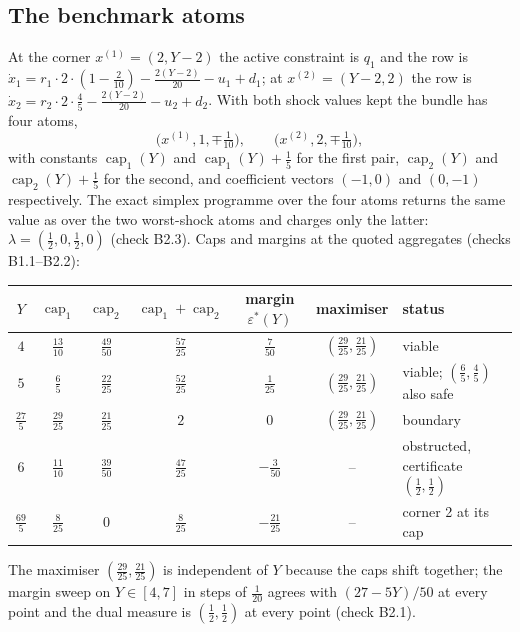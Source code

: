 \documentclass[11pt,a4paper]{article}
\theoremstyle{plain}
\theoremstyle{definition}
\theoremstyle{remark}
\newcommand{\capi}[1]{\operatorname{cap}_{#1}}
\newcommand{\tfr}[2]{\tfrac{#1}{#2}}
\begin{document}
\subsection{The benchmark atoms}
At the corner $x^{(1)}=(2,Y-2)$ the active constraint is $q_1$ and the row is $\dot x_1=r_1\cdot2\cdot(1-\tfr2{10})-\tfr{2(Y-2)}{20}-u_1+d_1$; at $x^{(2)}=(Y-2,2)$ the row is $\dot x_2=r_2\cdot2\cdot\tfr45-\tfr{2(Y-2)}{20}-u_2+d_2$. With both shock values kept the bundle has four atoms,
\[
\bigl(x^{(1)},1,\mp\tfr1{10}\bigr),\qquad \bigl(x^{(2)},2,\mp\tfr1{10}\bigr),
\]
with constants $\capi1(Y)$ and $\capi1(Y)+\tfr15$ for the first pair, $\capi2(Y)$ and $\capi2(Y)+\tfr15$ for the second, and coefficient vectors $(-1,0)$ and $(0,-1)$ respectively. The exact simplex programme over the four atoms returns the same value as over the two worst-shock atoms and charges only the latter: $\lambda=(\tfr12,0,\tfr12,0)$ (check B2.3). Caps and margins at the quoted aggregates (checks B1.1--B2.2):
\begin{center}\footnotesize
\begin{tabularx}{\textwidth}{cccccc>{\raggedright\arraybackslash}X}
\toprule
$Y$ & $\capi1$ & $\capi2$ & $\capi1+\capi2$ & margin $\varepsilon^\ast(Y)$ & maximiser & status\\
\midrule
$4$ & $\tfrac{13}{10}$ & $\tfrac{49}{50}$ & $\tfrac{57}{25}$ & $\tfrac{7}{50}$ & $(\tfrac{29}{25},\tfrac{21}{25})$ & viable\\
$5$ & $\tfrac{6}{5}$ & $\tfrac{22}{25}$ & $\tfrac{52}{25}$ & $\tfrac{1}{25}$ & $(\tfrac{29}{25},\tfrac{21}{25})$ & viable; $(\tfrac65,\tfrac45)$ also safe\\
$\tfrac{27}{5}$ & $\tfrac{29}{25}$ & $\tfrac{21}{25}$ & $2$ & $0$ & $(\tfrac{29}{25},\tfrac{21}{25})$ & boundary\\
$6$ & $\tfrac{11}{10}$ & $\tfrac{39}{50}$ & $\tfrac{47}{25}$ & $-\tfrac{3}{50}$ & -- & obstructed, certificate $(\tfrac12,\tfrac12)$\\
$\tfrac{69}{5}$ & $\tfrac{8}{25}$ & $0$ & $\tfrac{8}{25}$ & $-\tfrac{21}{25}$ & -- & corner 2 at its cap\\
\bottomrule
\end{tabularx}
\end{center}
The maximiser $(\tfr{29}{25},\tfr{21}{25})$ is independent of $Y$ because the caps shift together; the margin sweep on $Y\in[4,7]$ in steps of $\tfr1{20}$ agrees with $(27-5Y)/50$ at every point and the dual measure is $(\tfr12,\tfr12)$ at every point (check B2.1).
\end{document}
